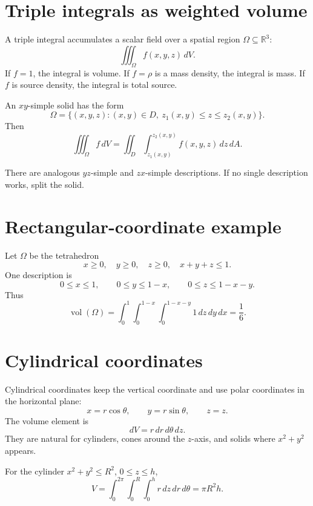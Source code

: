 
\section{Triple integrals as weighted volume}

A triple integral accumulates a scalar field over a spatial region \(\Omega\subseteq\mathbb R^3\):
\[
  \iiint_{\Omega} f(x,y,z)\,dV.
\]
If \(f=1\), the integral is volume.  If \(f=\rho\) is a mass density, the integral is mass.  If \(f\) is source density, the integral is total source.

\begin{definition}
An \(xy\)-simple solid has the form
\[
  \Omega=\{(x,y,z):(x,y)\in D,\ z_1(x,y)\le z\le z_2(x,y)\}.
\]
Then
\[
  \iiint_{\Omega} f\,dV
  =\iint_D\int_{z_1(x,y)}^{z_2(x,y)} f(x,y,z)\,dz\,dA.
\]
\end{definition}

There are analogous \(yz\)-simple and \(zx\)-simple descriptions.  If no single description works, split the solid.

\section{Rectangular-coordinate example}

\begin{example}
Let \(\Omega\) be the tetrahedron
\[
  x\ge0,\quad y\ge0,\quad z\ge0,\quad x+y+z\le1.
\]
One description is
\[
  0\le x\le1,\qquad 0\le y\le1-x,\qquad 0\le z\le1-x-y.
\]
Thus
\[
  \operatorname{vol}(\Omega)
  =\int_0^1\int_0^{1-x}\int_0^{1-x-y}1\,dz\,dy\,dx
  =\frac{1}{6}.
\]
\end{example}

\section{Cylindrical coordinates}

Cylindrical coordinates keep the vertical coordinate and use polar coordinates in the horizontal plane:
\[
  x=r\cos\theta,\qquad y=r\sin\theta,\qquad z=z.
\]
The volume element is
\[
  dV=r\,dr\,d\theta\,dz.
\]
They are natural for cylinders, cones around the \(z\)-axis, and solids where \(x^2+y^2\) appears.

\begin{example}
For the cylinder \(x^2+y^2\le R^2\), \(0\le z\le h\),
\[
  V=\int_0^{2\pi}\int_0^R\int_0^h r\,dz\,dr\,d\theta
  =\pi R^2h.
\]
\end{example}

